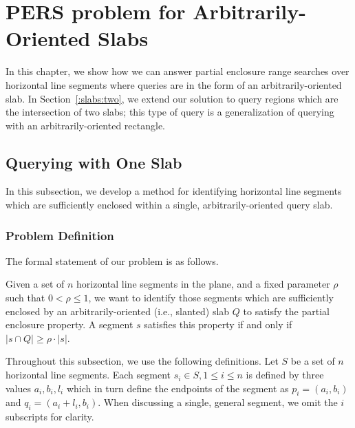 \section{PERS problem for Arbitrarily-Oriented Slabs}
\label{:slabs}

In this chapter, we show how we can answer partial enclosure range searches over horizontal line segments where queries are in the form of an arbitrarily-oriented slab.
In Section~\ref{:slabs:two}, we extend our solution to query regions which are the intersection of two slabs; this type of query is a generalization of querying with an arbitrarily-oriented rectangle.

\subsection{Querying with One Slab}
\label{:slabs:one}

In this subsection, we develop a method for identifying horizontal line segments which are sufficiently enclosed within a single, arbitrarily-oriented query slab.


\subsubsection{Problem Definition}
\label{:slabs:one:problem-definition}

The formal statement of our problem is as follows.

\begin{problem}
Given a set of $n$ horizontal line segments in the plane, and a fixed parameter $\rho$ such that $0 < \rho \leq 1$, we want to identify those segments which are sufficiently enclosed by an arbitrarily-oriented (i.e., slanted) slab $Q$ to satisfy the partial enclosure property.
A segment $s$ satisfies this property if and only if $|s \cap Q| \geq \rho \cdot |s|$.
\end{problem}

Throughout this subsection, we use the following definitions. 
Let $S$ be a set of $n$ horizontal line segments.
Each segment $s_i \in S, 1 \leq i \leq n$ is defined by three values $a_i, b_i, l_i$ which in turn define the endpoints of the segment as $p_i = (a_i, b_i)$ and $q_i = (a_i + l_i, b_i)$. 
When discussing a single, general segment, we omit the $i$ subscripts for clarity.

